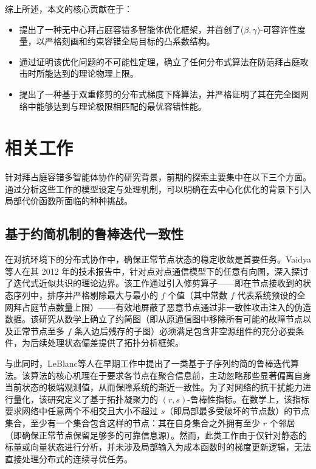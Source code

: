 综上所述，本文的核心贡献在于：
\begin{itemize}
    \item 提出了一种无中心拜占庭容错多智能体优化框架，并首创了($\beta, \gamma$)-可容许性度量，以严格刻画和约束容错全局目标的凸系数结构。
    \item 通过证明该优化问题的不可能性定理，确立了任何分布式算法在防范拜占庭攻击时所能达到的理论物理上限。
    \item 提出了一种基于双重修剪的分布式梯度下降算法，并严格证明了其在完全图网络中能够达到与理论极限相匹配的最优容错性能。
\end{itemize}

\section{相关工作}

\quad \quad  针对拜占庭容错多智能体协作的研究背景，前期的探索主要集中在以下三个方面。通过分析这些工作的模型设定与处理机制，可以明确在去中心化优化的背景下引入局部代价函数所面临的种种挑战。

\subsection{基于约简机制的鲁棒迭代一致性}

\quad \quad  在对抗环境下的分布式协作中，确保正常节点状态的稳定收敛是首要任务。Vaidya等人在其 2012 年的技术报告中，针对点对点通信模型下的任意有向图，深入探讨了迭代式近似共识的理论边界。该工作通过引入修剪算子——即在节点接收到的状态序列中，排序并严格剔除最大与最小的 $f$ 个值（其中常数 $f$ 代表系统预设的全网拜占庭节点数量上限）——有效地屏蔽了恶意节点通过非一致性攻击注入的伪造数据。该研究从数学上确立了约简图（即从原通信图中移除所有可能的故障节点以及正常节点至多 $f$ 条入边后残存的子图）必须满足包含非空源组件的充分必要条件，为后续处理状态偏差提供了拓扑分析框架。

与此同时，LeBlanc等人在早期工作中提出了一类基于子序列约简的鲁棒迭代算法\cite{leblanc2012consensus}。该算法的核心机理在于要求各节点在聚合信息前，主动忽略那些显著偏离自身当前状态的极端观测值，从而保障系统的渐近一致性。为了对网络的抗干扰能力进行量化，该研究定义了基于拓扑凝聚力的 $(r, s)$-鲁棒性指标。在数学上，该指标要求网络中任意两个不相交且大小不超过 $s$（即局部最多受破坏的节点数）的节点集合，至少有一个集合包含这样的节点：其在自身集合之外拥有至少 $r$ 个邻居（即确保正常节点保留足够多的可靠信息源）。然而，此类工作由于仅针对静态的标量或向量状态进行分析，并未涉及局部输入为成本函数时的梯度更新逻辑，无法直接处理分布式的连续寻优任务。

